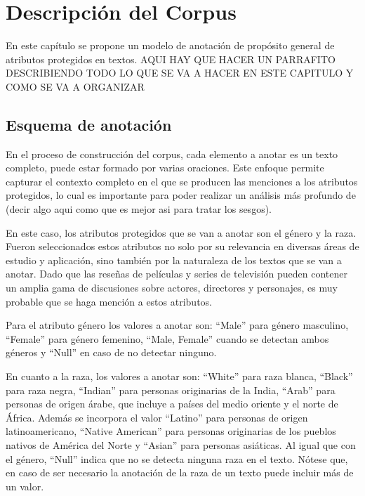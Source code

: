 \chapter{Descripci\'on del Corpus}\label{chapter:proposal}
En este cap\'itulo se propone un modelo de anotaci\'on de prop\'osito general de atributos protegidos
en textos. 
AQUI HAY QUE HACER UN PARRAFITO DESCRIBIENDO TODO LO QUE SE VA A HACER EN ESTE CAPITULO Y COMO SE VA A ORGANIZAR

\section{Esquema de anotaci\'on}\label{section:annotation_scheme}
En el proceso de construcci\'on del corpus, cada elemento a anotar es un texto completo, puede estar formado por varias oraciones. 
Este enfoque permite capturar el contexto completo en el que se producen las menciones a los atributos protegidos, 
lo cual es importante para poder realizar un an\'alisis m\'as profundo de (decir algo aqui como que es mejor asi para tratar los sesgos).

En este caso, los atributos protegidos que se van a anotar son el g\'enero y la raza.
Fueron seleccionados estos atributos no solo por su relevancia en diversas \'areas de estudio y aplicaci\'on, sino tambi\'en 
por la naturaleza de los textos que se van a anotar. Dado que las rese\~nas de pel\'iculas y series de televisi\'on
pueden contener un amplia gama de discusiones sobre actores, directores y personajes, es muy probable que se haga menci\'on a 
estos atributos.

Para el atributo g\'enero los valores a anotar son: ``Male'' para g\'enero masculino, ``Female'' para g\'enero femenino, 
``Male, Female'' cuando se detectan ambos g\'eneros y ``Null'' en caso de no detectar ninguno.

En cuanto a la raza, los valores a anotar son: ``White'' para raza blanca, ``Black'' para raza negra, ``Indian'' para 
personas originarias de la India, ``Arab'' para personas de origen \'arabe, que incluye a pa\'ises del medio oriente y el norte de 
\'Africa. Adem\'as se incorpora el valor ``Latino'' para personas de origen latinoamericano, ``Native American'' para personas 
originarias de los pueblos nativos de Am\'erica del Norte y ``Asian'' para personas asi\'aticas. Al igual que con el g\'enero, 
``Null'' indica que no se detecta ninguna raza en el texto. N\'otese que, en caso de ser necesario la anotaci\'on de la raza de un 
texto puede incluir m\'as de un valor.

